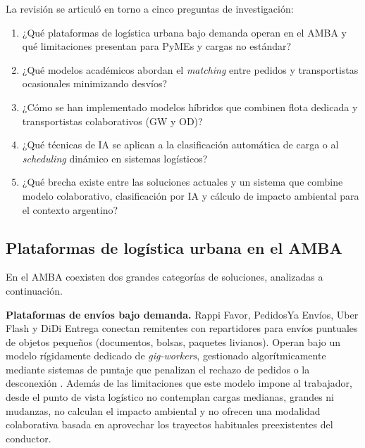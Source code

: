 La revisión se articuló en torno a cinco preguntas de investigación:

\begin{enumerate}[leftmargin=2em]
    \item ¿Qué plataformas de logística urbana bajo demanda operan en el AMBA y qué limitaciones presentan para PyMEs y cargas no estándar?
    \item ¿Qué modelos académicos abordan el \emph{matching} entre pedidos y transportistas ocasionales minimizando desvíos?
    \item ¿Cómo se han implementado modelos híbridos que combinen flota dedicada y transportistas colaborativos (GW y OD)?
    \item ¿Qué técnicas de IA se aplican a la clasificación automática de carga o al \emph{scheduling} dinámico en sistemas logísticos?
    \item ¿Qué brecha existe entre las soluciones actuales y un sistema que combine modelo colaborativo, clasificación por IA y cálculo de impacto ambiental para el contexto argentino?
\end{enumerate}

\subsection{Plataformas de logística urbana en el AMBA}

En el AMBA coexisten dos grandes categorías de soluciones, analizadas a continuación.

\textbf{Plataformas de envíos bajo demanda.} Rappi Favor, PedidosYa Envíos, Uber Flash y DiDi Entrega conectan remitentes con repartidores para envíos puntuales de objetos pequeños (documentos, bolsas, paquetes livianos). Operan bajo un modelo rígidamente dedicado de \emph{gig-workers}, gestionado algorítmicamente mediante sistemas de puntaje que penalizan el rechazo de pedidos o la desconexión \parencite{OIT2020}. Además de las limitaciones que este modelo impone al trabajador, desde el punto de vista logístico no contemplan cargas medianas, grandes ni mudanzas, no calculan el impacto ambiental y no ofrecen una modalidad colaborativa basada en aprovechar los trayectos habituales preexistentes del conductor.


